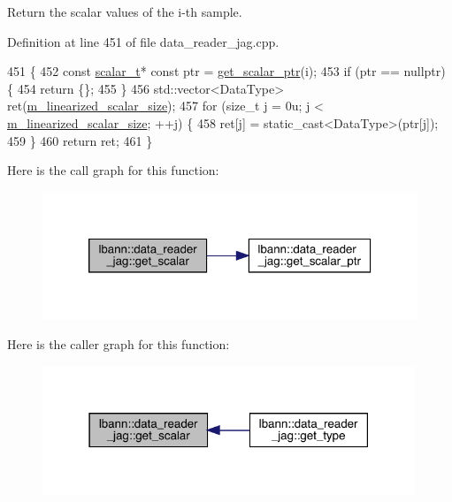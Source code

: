 Return the scalar values of the i-\/th sample. 



Definition at line 451 of file data\+\_\+reader\+\_\+jag.\+cpp.


\begin{DoxyCode}
451                                                                     \{
452   \textcolor{keyword}{const} \hyperlink{classlbann_1_1data__reader__jag_aa2e01bc071588b9c1a583e5a752abcc6}{scalar\_t}* \textcolor{keyword}{const} ptr = \hyperlink{classlbann_1_1data__reader__jag_abaa3c00c30ebaa54d395c93f0225570c}{get\_scalar\_ptr}(i);
453   \textcolor{keywordflow}{if} (ptr == \textcolor{keyword}{nullptr}) \{
454     \textcolor{keywordflow}{return} \{\};
455   \}
456   std::vector<DataType> ret(\hyperlink{classlbann_1_1data__reader__jag_a856b4b9cdf9d8569e5fef1d5d996870d}{m\_linearized\_scalar\_size});
457   \textcolor{keywordflow}{for} (\textcolor{keywordtype}{size\_t} j = 0u; j < \hyperlink{classlbann_1_1data__reader__jag_a856b4b9cdf9d8569e5fef1d5d996870d}{m\_linearized\_scalar\_size}; ++j) \{
458     ret[j] = \textcolor{keyword}{static\_cast<}DataType\textcolor{keyword}{>}(ptr[j]);
459   \}
460   \textcolor{keywordflow}{return} ret;
461 \}
\end{DoxyCode}
Here is the call graph for this function\+:\nopagebreak
\begin{figure}[H]
\begin{center}
\leavevmode
\includegraphics[width=320pt]{classlbann_1_1data__reader__jag_ad99fffc2f11cb6f3fc42ef1138a3f925_cgraph}
\end{center}
\end{figure}
Here is the caller graph for this function\+:\nopagebreak
\begin{figure}[H]
\begin{center}
\leavevmode
\includegraphics[width=316pt]{classlbann_1_1data__reader__jag_ad99fffc2f11cb6f3fc42ef1138a3f925_icgraph}
\end{center}
\end{figure}
\mbox{\label{classlbann_1_1data__reader__jag_abaa3c00c30ebaa54d395c93f0225570c}} 

